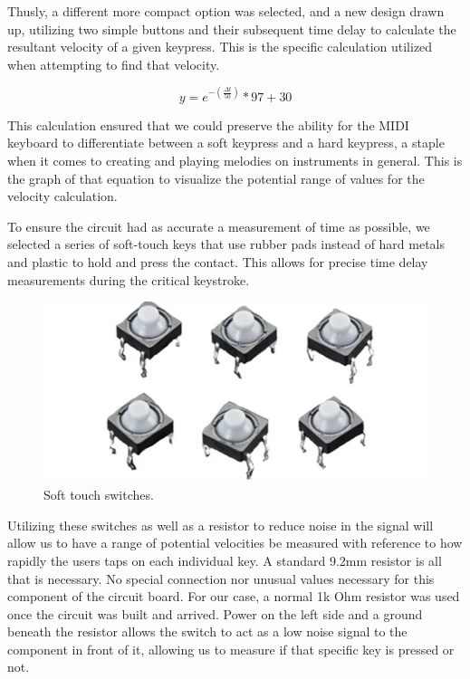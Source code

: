 Thusly, a different more compact option was selected, and a new design drawn up, utilizing
two simple buttons and their subsequent time delay to calculate the resultant velocity of
a given keypress. This is the specific calculation utilized when attempting to find that
velocity.

\begin{equation*}
  y = e^{-(\frac{\Delta t}{50})} * 97 + 30
\end{equation*}

This calculation ensured that we could preserve the ability for the MIDI keyboard to
differentiate between a soft keypress and a hard keypress, a staple when it comes to
creating and playing melodies on instruments in general. This is the graph of that
equation to visualize the potential range of values for the velocity calculation.


To ensure the circuit had as accurate a measurement of time as possible, we selected a
series of soft-touch keys that use rubber pads instead of hard metals and plastic to hold
and press the contact. This allows for precise time delay measurements during the critical
keystroke.

\begin{figure}[h!]
  \centering
  \includegraphics[width=\linewidth]{image/softtouchswitches.png}
  \caption{Soft touch switches.}
\end{figure}


Utilizing these switches as well as a resistor to reduce noise in the signal will allow us
to have a range of potential velocities be measured with reference to how rapidly the
users taps on each individual key. A standard 9.2mm resistor is all that is necessary. No
special connection nor unusual values necessary for this component of the circuit board.
For our case, a normal 1k Ohm resistor was used once the circuit was built and arrived.
Power on the left side and a ground beneath the resistor allows the switch to act as a low
noise signal to the component in front of it, allowing us to measure if that specific key
is pressed or not.

